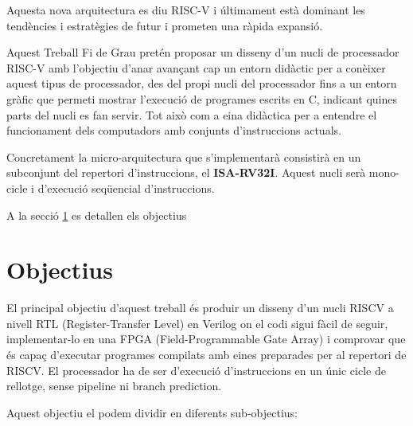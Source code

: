 \documentclass[10pt,a4paper,twocolumn,twoside]{article}
\begin{document}
Aquesta nova arquitectura es diu RISC-V i últimament està dominant les tendències i estratègies de futur i prometen una ràpida expansió.

Aquest Treball Fi de Grau pretén proposar un disseny d'un nucli de processador RISC-V amb l’objectiu d’anar avançant cap un entorn didàctic per a conèixer aquest tipus de processador, des del propi nucli del processador fins a un entorn gràfic que permeti mostrar l'execució de programes escrits en C, indicant quines parts del nucli es fan servir.
Tot això com a eina didàctica per a entendre el funcionament dels computadors amb conjunts d'instruccions actuals. 

Concretament la micro-arquitectura que s'implementarà consistirà en un subconjunt del repertori d’instruccions, el \textbf{ISA-RV32I}. 
Aquest nucli serà mono-cicle i d’execució seqüencial d’instruccions. 

A la secció \ref{sec:Obj} es detallen els objectius





\section{Objectius} 
\label{sec:Obj}
El principal objectiu d'aquest treball és produir un disseny d'un nucli RISCV a nivell RTL (Register-Transfer Level) en Verilog on el codi sigui fàcil de seguir, implementar-lo en una FPGA (Field-Programmable Gate Array) i comprovar que és capaç d’executar programes compilats amb eines preparades per al repertori de RISCV. El processador ha de ser d’execució d’instruccions en un únic cicle de rellotge, sense pipeline ni branch prediction.

Aquest objectiu el podem dividir en diferents sub-objectius:
\end{document}
